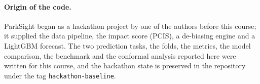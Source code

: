 \paragraph{Origin of the code.} ParkSight began as a hackathon project by one of the authors before this course; it supplied the data pipeline, the impact score (PCIS), a de-biasing engine and a LightGBM forecast. The two prediction tasks, the folds, the metrics, the model comparison, the benchmark and the conformal analysis reported here were written for this course, and the hackathon state is preserved in the repository under the tag \texttt{hackathon-baseline}.
